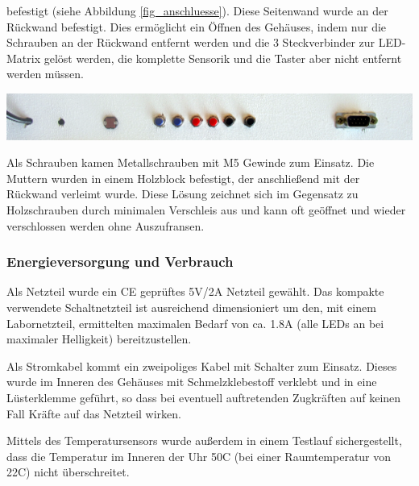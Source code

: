 befestigt (siehe Abbildung \ref{fig_anschluesse}). Diese Seitenwand wurde an der Rückwand befestigt. Dies ermöglicht ein Öffnen des Gehäuses, indem nur die Schrauben an der Rückwand entfernt werden und die 3 Steckverbinder zur LED-Matrix gelöst werden, die komplette Sensorik und die Taster aber nicht entfernt werden müssen.%
\vspace{2em}
\centerline{\includegraphics[width=\linewidth]{images/anschluesse.png}}
\label{fig_anschluesse}
\vspace{.5em}

Als Schrauben kamen Metallschrauben mit M5 %
Gewinde zum Einsatz. Die Muttern wurden in einem Holzblock befestigt, der anschließend mit der Rückwand verleimt wurde.%
Diese Lösung zeichnet sich im Gegensatz zu Holzschrauben durch minimalen Verschleis aus und kann oft geöffnet und wieder verschlossen werden ohne Auszufransen.

\subsubsection{Energieversorgung und Verbrauch}
Als Netzteil wurde ein CE geprüftes 5V/2A Netzteil gewählt. Das kompakte verwendete Schaltnetzteil ist ausreichend dimensioniert um den, mit einem Labornetzteil, ermittelten maximalen Bedarf von ca. 1.8A%
(alle LEDs an bei maximaler Helligkeit) bereitzustellen.
 
Als Stromkabel kommt ein zweipoliges Kabel mit Schalter zum Einsatz. Dieses wurde im Inneren des Gehäuses mit Schmelzklebestoff verklebt und in eine Lüsterklemme geführt, so dass bei eventuell auftretenden Zugkräften auf keinen Fall Kräfte auf das Netzteil wirken.

Mittels des Temperatursensors wurde außerdem in einem Testlauf sichergestellt, dass die Temperatur im Inneren der Uhr 50\degree C (bei einer Raumtemperatur von 22\degree C) nicht überschreitet.
